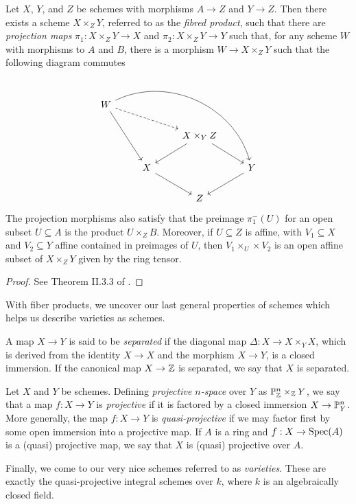 \begin{theorem}
    Let $X$, $Y$, and $Z$ be schemes with morphisms $A \to Z$ and $Y \to Z$.
    Then there exists a scheme $X \times_Z Y$,
    referred to as the \textit{fibred product},
    such that there are \textit{projection maps} $\pi_1 : X \times_Z Y \to X$ and $\pi_2 : X \times_Z Y \to Y$ such that,
    for any scheme $W$ with morphisms to $A$ and $B$,
    there is a morphism $W \to X \times_Z Y$ such that the following diagram commutes
    \[
        \begin{tikzcd}
            W \arrow[drr, dashed] \arrow[ddr] \arrow[ddrrr, bend left=50] & & & \\
            & & X \times_Y Z \arrow[dl] \arrow[dr]  & \\
            & X \arrow[dr] & & Y \arrow[dl] \\
            & & Z & 
        \end{tikzcd}
    \]
    The projection morphisms also satisfy that the preimage $\pi_1^{-}(U)$ for an open subset $U \subseteq A$ is the product $U \times_Z B$. 
    Moreover, if $U \subseteq Z$ is affine,
    with $V_1 \subseteq X$ and $V_2 \subseteq Y$ affine contained in preimages of $U$,
    then $V_1 \times_U \times V_2$ is an open affine subset of $X \times_Z Y$ given by the ring tensor.
\end{theorem}
\begin{proof}
    See Theorem II.3.3 of \cite{Hartshorne_2013}.
\end{proof}

With fiber products, we uncover our last general properties of schemes which helps us describe varieties as schemes.

\begin{definition}
    A map $X \to Y$ is said to be \textit{separated} if the diagonal map $\Delta : X \to X \times_Y X$,
    which is derived from the identity $X \to X$ and the morphism $X \to Y$,
    is a closed immersion.
    If the canonical map $X \to \mathbb{Z}$ is separated, we say that $X$ is separated.
\end{definition}

\begin{definition}
    Let $X$ and $Y$ be schemes.
    Defining \textit{projective $n$-space} over $Y$ as $\mathbb{P}^n_{\mathbb{Z}} \times_{\mathbb{Z}} Y$,
    we say that a map $f : X \to Y$ is \textit{projective} if it is factored by a closed immersion $X \to \mathbb{P}^n_Y$.
    More generally, the map $f : X \to Y$ is \textit{quasi-projective} if we may factor first by some open immersion into a projective map.
    If $A$ is a ring and $f : X \to {\rm Spec}(A)$ is a (quasi) projective map,
    we say that $X$ is (quasi) projective over $A$.
\end{definition}
 
Finally, we come to our very nice schemes referred to as \textit{varieties}.
These are exactly the quasi-projective integral schemes over $k$,
where $k$ is an algebraically closed field.